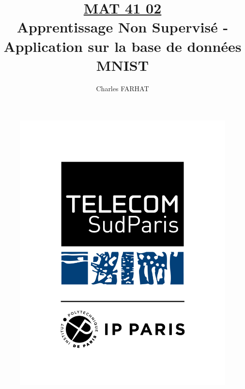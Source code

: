 \documentclass{article}
\title{
    \underline{MAT 41 02} \\
    Apprentissage Non Supervisé - Application sur la base de données MNIST
}
\author{Charles FARHAT}
\begin{document}
\maketitle

\begin{figure}[h]
    \centering
    \includegraphics[scale=0.22]{Images/1024-1318.png}
\end{figure}


\newpage
{}
\begin{center}

    \tableofcontents
\end{center}
\end{document}
